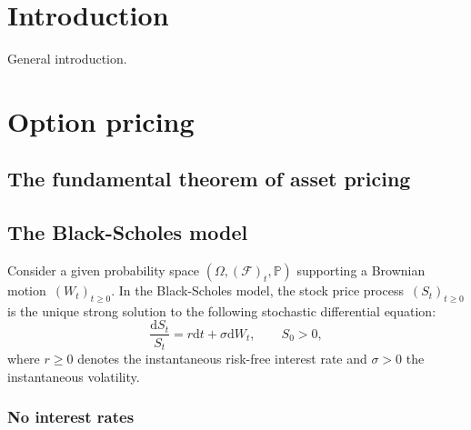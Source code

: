\documentclass[a4paper]{article}
\theoremstyle{definition}
\newcommand{\D}{\mathrm{d}}
\numberwithin{equation}{section}
\begin{document}


\setcounter{tocdepth}{4}
\tableofcontents
\newpage
%
\fancyhead{}
\fancyfoot{}
\pagestyle{fancy} 
\fancyhead[RO,LE]{\sffamily\small \thepage}
\fancyhead[LO,RE]{\sffamily\small \nouppercase{\rightmark}}
\renewcommand{\headrulewidth}{0.4pt}
\renewcommand{\footrulewidth}{0.0pt}
%
%
%
%




\section{Introduction}
General introduction.

\section{Option pricing}
\subsection{The fundamental theorem of asset pricing}

\subsection{The Black-Scholes model}
Consider a given probability space $(\Omega, (\mathcal{F})_t,\mathbb{P})$ 
supporting a Brownian motion~$(W_t)_{t\geq 0}$.
In the Black-Scholes model, the stock price process~$(S_t)_{t\geq 0}$ is the unique strong solution to
the following stochastic differential equation:
\begin{equation}\label{eq:BS}
\frac{\D S_t}{S_t} = r \D t + \sigma \D W_t,
\qquad S_0>0,
\end{equation}
where $r\geq 0$ denotes the instantaneous risk-free interest rate and $\sigma>0$ the instantaneous volatility.

\subsubsection{No interest rates}
\end{document}
